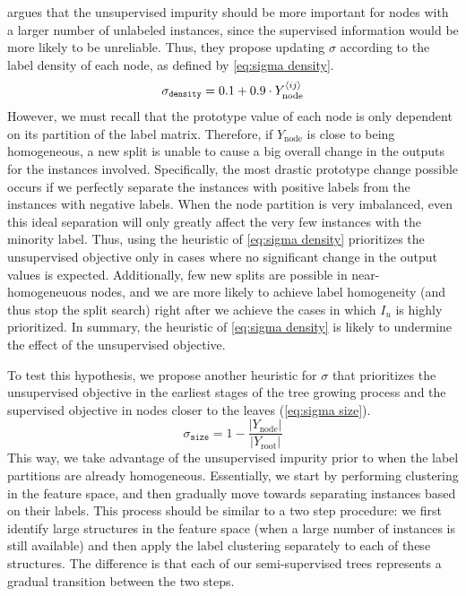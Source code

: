  argues that the unsupervised impurity should be more important for nodes with a larger number of unlabeled instances, since the supervised information would be more likely to be unreliable. Thus, they propose updating $\sigma$ according to the label density of each node, as defined by \autoref{eq:sigma density}.
%
\begin{equation}
    \sigma_\texttt{density} = 0.1 + 0.9 \cdot Y_\text{node}^{\langle ij \rangle}
    \label{eq:sigma density}
\end{equation}
%
However, we must recall that the prototype value of each node is only dependent on its partition of the label matrix. Therefore, if $Y_\text{node}$ is close to being homogeneous, a new split is unable to cause a big overall change in the outputs for the instances involved. Specifically, the most drastic prototype change possible occurs if we perfectly separate the instances with positive labels from the instances with negative labels.
When the node partition is very imbalanced, even this ideal separation will only greatly affect the very few instances with the minority label. Thus, using the heuristic of \autoref{eq:sigma density} prioritizes the unsupervised objective only in cases where no significant change in the output values is expected. Additionally, few new splits are possible in near-homogeneuous nodes, and we are more likely to achieve label homogeneity (and thus stop the split search) right after we achieve the cases in which $I_u$ is highly prioritized. In summary, the heuristic of \autoref{eq:sigma density} is likely to undermine the effect of the unsupervised objective.


To test this hypothesis, we propose another heuristic for $\sigma$ that prioritizes the unsupervised objective in the earliest stages of the tree growing process and the supervised objective in nodes closer to the leaves (\autoref{eq:sigma size}).
%
\begin{equation}
    \sigma_\texttt{size} = 1 - \frac{|Y_\text{node}|}{|Y_\text{root}|}
    \label{eq:sigma size}
\end{equation}
%
This way, we take advantage of the unsupervised impurity prior to when the label partitions are already homogeneous. Essentially, we start by performing clustering in the feature space, and then gradually move towards separating instances based on their labels.
This process should be similar to a two step procedure: we first identify large structures in the feature space (when a large number of instances is still available) and then apply the label clustering separately to each of these structures. The difference is that each of our semi-supervised trees represents a gradual transition between the two steps.

